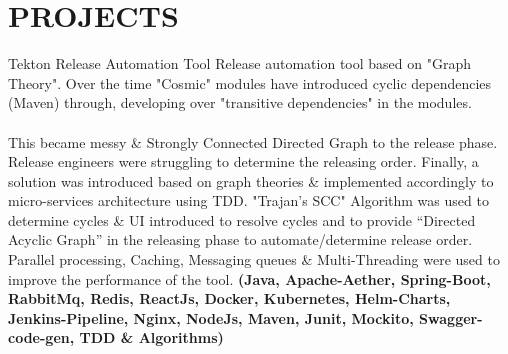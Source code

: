 \documentclass[]{cv-class}
\begin{document}
\section{PROJECTS}
\begin{entrylist}
    \entry
    {}
	{Tekton}
    {Release Automation Tool}
	{
	    Release automation tool based on "Graph Theory". Over the time "Cosmic" modules have introduced cyclic dependencies (Maven) through, developing over "transitive dependencies" in the modules.
	    \\
	    \\
	    This became messy \& Strongly Connected Directed Graph to the release phase. Release engineers were struggling to determine the releasing order.
	    Finally, a solution was introduced based on graph theories \& implemented accordingly to micro-services architecture using TDD.
	    "Trajan’s SCC" Algorithm was used to determine cycles \& UI introduced to resolve cycles and to provide “Directed Acyclic Graph”
	    in the releasing phase to automate/determine release order.
	    Parallel processing, Caching, Messaging queues \& Multi-Threading were used to improve the performance of the tool.
        \textbf{(Java, Apache-Aether, Spring-Boot, RabbitMq, Redis, ReactJs, Docker, Kubernetes, Helm-Charts, Jenkins-Pipeline, Nginx, NodeJs, Maven, Junit, Mockito, Swagger-code-gen, TDD \& Algorithms)}
	}
	\\
	\end{entrylist}


\newpage
\begin{aside}
\end{aside}
\end{document}
